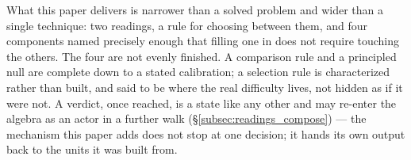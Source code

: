 \documentclass[12pt, a4paper]{article}
\begin{document}
What this paper delivers is narrower than a solved problem and wider
than a single technique: two readings, a rule for choosing between
them, and four components named precisely enough that filling one in
does not require touching the others. The four are not evenly
finished. A comparison rule and a principled null are complete down
to a stated calibration; a selection rule is characterized rather
than built, and said to be where the real difficulty lives, not
hidden as if it were not. A verdict, once reached, is a state like
any other and may re-enter the algebra as an actor in a further
walk (\S\ref{subsec:readings_compose}) --- the mechanism this paper
adds does not stop at one decision; it hands its own output back to
the units it was built from.
\end{document}
